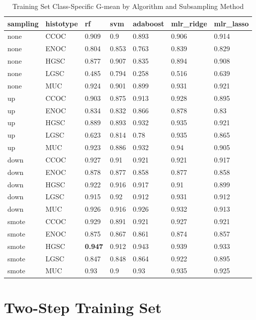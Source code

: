\documentclass[
]{report}
\begin{document}
\begin{table}

\caption{\label{tab:train-gmean-class-table}Training Set Class-Specific G-mean by Algorithm and Subsampling Method}
\centering
\begin{tabular}[t]{l|l|l|l|l|l|l}
\hline
sampling & histotype & rf & svm & adaboost & mlr\_ridge & mlr\_lasso\\
\hline
none & CCOC & 0.909 & 0.9 & 0.893 & 0.906 & 0.914\\
\hline
none & ENOC & 0.804 & 0.853 & 0.763 & 0.839 & 0.829\\
\hline
none & HGSC & 0.877 & 0.907 & 0.835 & 0.894 & 0.908\\
\hline
none & LGSC & 0.485 & 0.794 & 0.258 & 0.516 & 0.639\\
\hline
none & MUC & 0.924 & 0.901 & 0.899 & 0.931 & 0.921\\
\hline
up & CCOC & 0.903 & 0.875 & 0.913 & 0.928 & 0.895\\
\hline
up & ENOC & 0.834 & 0.832 & 0.866 & 0.878 & 0.83\\
\hline
up & HGSC & 0.889 & 0.893 & 0.932 & 0.935 & 0.921\\
\hline
up & LGSC & 0.623 & 0.814 & 0.78 & 0.935 & 0.865\\
\hline
up & MUC & 0.923 & 0.886 & 0.932 & 0.94 & 0.905\\
\hline
down & CCOC & 0.927 & 0.91 & 0.921 & 0.921 & 0.917\\
\hline
down & ENOC & 0.878 & 0.877 & 0.858 & 0.877 & 0.858\\
\hline
down & HGSC & 0.922 & 0.916 & 0.917 & 0.91 & 0.899\\
\hline
down & LGSC & 0.915 & 0.92 & 0.912 & 0.931 & 0.912\\
\hline
down & MUC & 0.926 & 0.916 & 0.926 & 0.932 & 0.913\\
\hline
smote & CCOC & 0.929 & 0.891 & 0.921 & 0.927 & 0.921\\
\hline
smote & ENOC & 0.875 & 0.867 & 0.861 & 0.874 & 0.857\\
\hline
smote & HGSC & \textbf{0.947} & 0.912 & 0.943 & 0.939 & 0.933\\
\hline
smote & LGSC & 0.847 & 0.848 & 0.864 & 0.922 & 0.895\\
\hline
smote & MUC & 0.93 & 0.9 & 0.93 & 0.935 & 0.925\\
\hline
\end{tabular}
\end{table}

\hypertarget{two-step-training-set}{%
\section{Two-Step Training Set}\label{two-step-training-set}}
\end{document}
